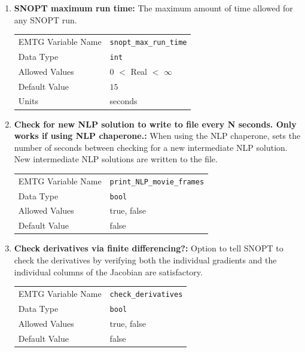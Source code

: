 \begin{enumerate}
    \item \textbf{\ac{SNOPT} maximum run time:} The maximum amount of time allowed for any \ac{SNOPT} run.
    \begin{table}[H]
        \hspace{2cm}
        \begin{tabular}{lp{5cm}}
        \ac{EMTG} Variable Name & \verb|snopt_max_run_time| \\
        Data Type & \verb|int| \\
        Allowed Values & $0$ $<$ Real $<$ $\infty$ \\
        Default Value & $15$ \\
        Units & seconds
        \end{tabular}
    \end{table}
    
    \item \textbf{Check for new \ac{NLP} solution to write to file every N seconds. Only works if using \ac{NLP} chaperone.:} When using the \ac{NLP} chaperone, sets the number of seconds between checking for a new intermediate \ac{NLP} solution. New intermediate \ac{NLP} solutions are written to the file.
    \begin{table}[H]
        \hspace{2cm}
        \begin{tabular}{lp{5cm}}
        \ac{EMTG} Variable Name & \verb|print_NLP_movie_frames| \\
        Data Type & \verb|bool| \\
        Allowed Values & true, false \\
        Default Value & false \\
        \end{tabular}
    \end{table}
    
    
    \item \textbf{Check derivatives via finite differencing?:} Option to tell \ac{SNOPT} to check the derivatives by verifying both the individual gradients and the individual columns of the Jacobian are satisfactory.
    \begin{table}[H]
        \hspace{2cm}
        \begin{tabular}{lp{5cm}}
        \ac{EMTG} Variable Name & \verb|check_derivatives| \\
        Data Type & \verb|bool| \\
        Allowed Values & true, false \\
        Default Value & false \\
        \end{tabular}
    \end{table}
    

\end{enumerate}
